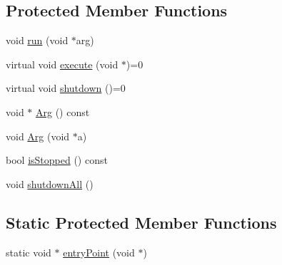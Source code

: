 \subsection*{Protected Member Functions}
\begin{DoxyCompactItemize}
\item 
void \hyperlink{classthread_1_1_h_a_w_thread_a9a3e17be59877d350e310eb19c52679b}{run} (void $\ast$arg)
\item 
virtual void \hyperlink{classthread_1_1_h_a_w_thread_ae565cb73c096b246664bd2474b9c8907}{execute} (void $\ast$)=0
\item 
virtual void \hyperlink{classthread_1_1_h_a_w_thread_a843ee9493a41cec7e932fdec67a3b244}{shutdown} ()=0
\item 
void $\ast$ \hyperlink{classthread_1_1_h_a_w_thread_ab692f3a55b92623653d8213793ba4ebb}{Arg} () const 
\item 
void \hyperlink{classthread_1_1_h_a_w_thread_a368c07a801fb8f5e7bb181d2453df4be}{Arg} (void $\ast$a)
\item 
bool \hyperlink{classthread_1_1_h_a_w_thread_a46e9f127856f36917b3a8a345b7be5ee}{is\-Stopped} () const 
\item 
void \hyperlink{classthread_1_1_h_a_w_thread_a5124385e940aa8d52510a4be10af173c}{shutdown\-All} ()
\end{DoxyCompactItemize}
\subsection*{Static Protected Member Functions}
\begin{DoxyCompactItemize}
\item 
static void $\ast$ \hyperlink{classthread_1_1_h_a_w_thread_a044da2e1a8884a3e2764f9f1863863c7}{entry\-Point} (void $\ast$)
\end{DoxyCompactItemize}



